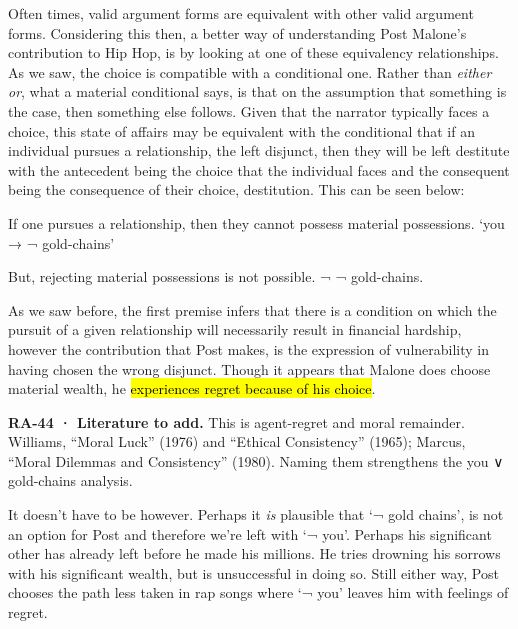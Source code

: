 \documentclass[
  letterpaper,
  DIV=11,
  numbers=noendperiod]{scrartcl}
\theoremstyle{remark}
\begin{document}
Often times, valid argument forms are equivalent with other valid
argument forms. Considering this then, a better way of understanding
Post Malone's contribution to Hip Hop, is by looking at one of these
equivalency relationships. As we saw, the choice is compatible with a
conditional one. Rather than \emph{either or}, what a material
conditional says, is that on the assumption that something is the case,
then something else follows. Given that the narrator typically faces a
choice, this state of affairs may be equivalent with the conditional
that if an individual pursues a relationship, the left disjunct, then
they will be left destitute with the antecedent being the choice that
the individual faces and the consequent being the consequence of their
choice, destitution. This can be seen below:

If one pursues a relationship, then they cannot possess material
possessions. `you → ¬ gold-chains'

But, rejecting material possessions is not possible. ¬ ¬ gold-chains.

As we saw before, the first premise infers that there is a condition on
which the pursuit of a given relationship will necessarily result in
financial hardship, however the contribution that Post makes, is the
expression of vulnerability in having chosen the wrong disjunct. Though
it appears that Malone does choose material wealth, he \hl{experiences
regret because of his choice}.

\begin{tcolorbox}[enhanced jigsaw, arc=.35mm, bottomrule=.15mm, bottomtitle=1mm, breakable, colback=white, colbacktitle=quarto-callout-tip-color!10!white, colframe=quarto-callout-tip-color-frame, coltitle=black, left=2mm, leftrule=.75mm, opacityback=0, opacitybacktitle=0.6, rightrule=.15mm, title=\textcolor{quarto-callout-tip-color}{\faLightbulb}\hspace{0.5em}{Tip}, titlerule=0mm, toprule=.15mm, toptitle=1mm]

\textbf{RA-44 · Literature to add.} This is agent-regret and moral
remainder. Williams, ``Moral Luck'' (1976) and ``Ethical Consistency''
(1965); Marcus, ``Moral Dilemmas and Consistency'' (1980). Naming them
strengthens the you ∨ gold-chains analysis.

\end{tcolorbox}

It doesn't have to be however. Perhaps it \emph{is} plausible that `¬
gold chains', is not an option for Post and therefore we're left with `¬
you'. Perhaps his significant other has already left before he made his
millions. He tries drowning his sorrows with his significant wealth, but
is unsuccessful in doing so. Still either way, Post chooses the path
less taken in rap songs where `¬ you' leaves him with feelings of
regret.
\end{document}
